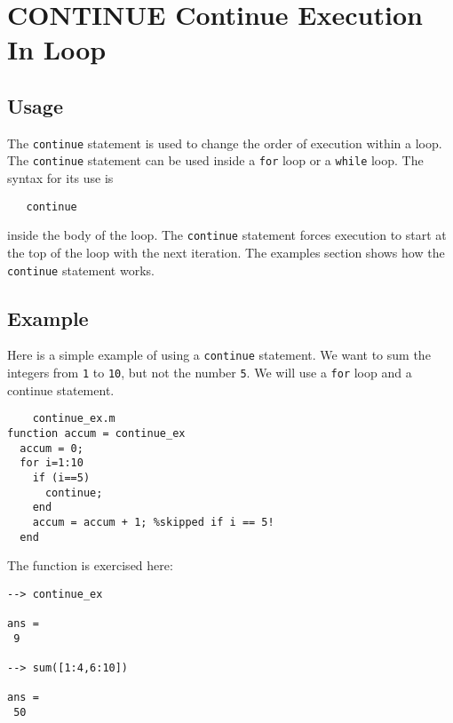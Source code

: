 \section{CONTINUE Continue Execution In Loop}

\subsection{Usage}

The \verb|continue| statement is used to change the order of
execution within a loop.  The \verb|continue| statement can
be used inside a \verb|for| loop or a \verb|while| loop.  The
syntax for its use is
\begin{verbatim}
   continue
\end{verbatim}
inside the body of the loop.  The \verb|continue| statement
forces execution to start at the top of the loop with
the next iteration.  The examples section shows how
the \verb|continue| statement works.
\subsection{Example}

Here is a simple example of using a \verb|continue| statement.
We want to sum the integers from \verb|1| to \verb|10|, but not
the number \verb|5|.  We will use a \verb|for| loop and a continue
statement.
\begin{verbatim}
    continue_ex.m
function accum = continue_ex
  accum = 0;
  for i=1:10
    if (i==5)
      continue;
    end
    accum = accum + 1; %skipped if i == 5!
  end
\end{verbatim}
The function is exercised here:
\begin{verbatim}
--> continue_ex

ans = 
 9 

--> sum([1:4,6:10])

ans = 
 50 
\end{verbatim}
